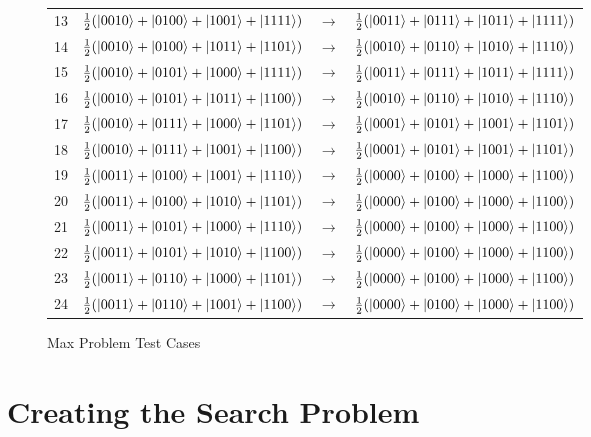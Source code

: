 \begin{figure}
\begin{center}
\begin{tabular}{c|ccc|}
  13 & $\frac{1}{2}(\ket{0010}+\ket{0100}+\ket{1001}+\ket{1111})$ & $\rightarrow$ & $\frac{1}{2}(\ket{0011}+\ket{0111}+\ket{1011}+\ket{1111})$ \\ %
  14 & $\frac{1}{2}(\ket{0010}+\ket{0100}+\ket{1011}+\ket{1101})$ & $\rightarrow$ & $\frac{1}{2}(\ket{0010}+\ket{0110}+\ket{1010}+\ket{1110})$ \\ %
  15 & $\frac{1}{2}(\ket{0010}+\ket{0101}+\ket{1000}+\ket{1111})$ & $\rightarrow$ & $\frac{1}{2}(\ket{0011}+\ket{0111}+\ket{1011}+\ket{1111})$ \\ %
  16 & $\frac{1}{2}(\ket{0010}+\ket{0101}+\ket{1011}+\ket{1100})$ & $\rightarrow$ & $\frac{1}{2}(\ket{0010}+\ket{0110}+\ket{1010}+\ket{1110})$ \\ %
  17 & $\frac{1}{2}(\ket{0010}+\ket{0111}+\ket{1000}+\ket{1101})$ & $\rightarrow$ & $\frac{1}{2}(\ket{0001}+\ket{0101}+\ket{1001}+\ket{1101})$ \\ %
  18 & $\frac{1}{2}(\ket{0010}+\ket{0111}+\ket{1001}+\ket{1100})$ & $\rightarrow$ & $\frac{1}{2}(\ket{0001}+\ket{0101}+\ket{1001}+\ket{1101})$ \\ \hline
  19 & $\frac{1}{2}(\ket{0011}+\ket{0100}+\ket{1001}+\ket{1110})$ & $\rightarrow$ & $\frac{1}{2}(\ket{0000}+\ket{0100}+\ket{1000}+\ket{1100})$ \\ %
  20 & $\frac{1}{2}(\ket{0011}+\ket{0100}+\ket{1010}+\ket{1101})$ & $\rightarrow$ & $\frac{1}{2}(\ket{0000}+\ket{0100}+\ket{1000}+\ket{1100})$ \\ %
  21 & $\frac{1}{2}(\ket{0011}+\ket{0101}+\ket{1000}+\ket{1110})$ & $\rightarrow$ & $\frac{1}{2}(\ket{0000}+\ket{0100}+\ket{1000}+\ket{1100})$ \\ %
  22 & $\frac{1}{2}(\ket{0011}+\ket{0101}+\ket{1010}+\ket{1100})$ & $\rightarrow$ & $\frac{1}{2}(\ket{0000}+\ket{0100}+\ket{1000}+\ket{1100})$ \\ %
  23 & $\frac{1}{2}(\ket{0011}+\ket{0110}+\ket{1000}+\ket{1101})$ & $\rightarrow$ & $\frac{1}{2}(\ket{0000}+\ket{0100}+\ket{1000}+\ket{1100})$ \\ %
  24 & $\frac{1}{2}(\ket{0011}+\ket{0110}+\ket{1001}+\ket{1100})$ & $\rightarrow$ & $\frac{1}{2}(\ket{0000}+\ket{0100}+\ket{1000}+\ket{1100})$ \\ \hline
 \end{tabular}
\end{center}
\caption{Max Problem Test Cases}
\label{fig:maxprobtcs}
\end{figure}

\section{Creating the Search Problem}
\label{sec:createsearchproblem}

